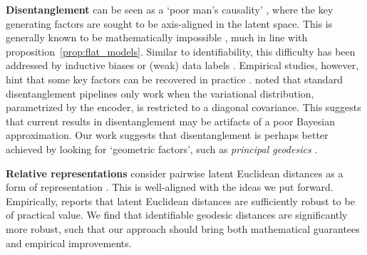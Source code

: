 \textbf{Disentanglement} can be seen as a `poor man's causality' \citep{detlefsen2019explicit}, where the key generating factors are sought to be axis-aligned in the latent space. This is generally known to be mathematically impossible \citep{pmlr-v97-locatello19a}, much in line with proposition~\ref{prop:flat_models}. Similar to identifiability, this difficulty has been addressed by inductive biases \citep{bouchacourt2018multi} or (weak) data labels \citep{pmlr-v119-locatello20a, locatello2019disentangling, shu2019weakly}. Empirical studies, however, hint that some key factors can be recovered in practice \citep{higgins2016beta, dittadi2020transfer, pmlr-v97-suter19a}. \citet{rolinek2019variational} noted that standard disentanglement pipelines only work when the variational distribution, parametrized by the encoder, is restricted to a diagonal covariance. This suggests that current results in disentanglement may be artifacts of a poor Bayesian approximation. Our work suggests that disentanglement is perhaps better achieved by looking for `geometric factors', such as \emph{principal geodesics} \citep{fletcher2004principal}.

\textbf{Relative representations} consider pairwise latent Euclidean distances as a form of representation \citep{moschella2022relative}. This is well-aligned with the ideas we put forward. Empirically, \citet{moschella2022relative} reports that latent Euclidean distances are sufficiently robust to be of practical value. We find that identifiable geodesic distances are significantly more robust, such that our approach should bring both mathematical guarantees and empirical improvements.



 







